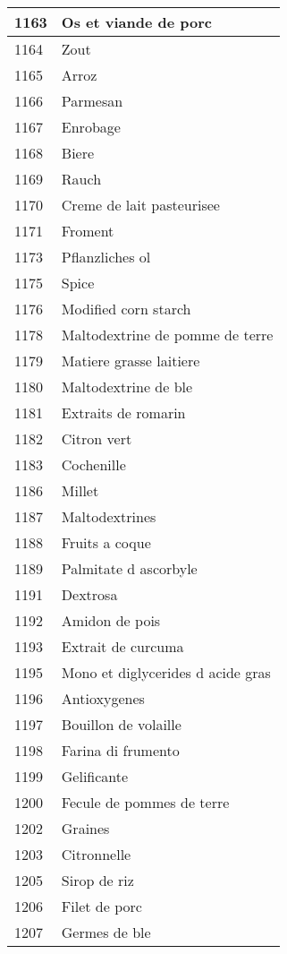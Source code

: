 \begin{longtable}{|l|l|}
1163 & Os et viande de porc \\ \hline 
1164 & Zout \\ \hline 
1165 & Arroz \\ \hline 
1166 & Parmesan \\ \hline 
1167 & Enrobage \\ \hline 
1168 & Biere \\ \hline 
1169 & Rauch \\ \hline 
1170 & Creme de lait pasteurisee \\ \hline 
1171 & Froment \\ \hline 
1173 & Pflanzliches ol \\ \hline 
1175 & Spice \\ \hline 
1176 & Modified corn starch \\ \hline 
1178 & Maltodextrine de pomme de terre \\ \hline 
1179 & Matiere grasse laitiere \\ \hline 
1180 & Maltodextrine de ble \\ \hline 
1181 & Extraits de romarin \\ \hline 
1182 & Citron vert \\ \hline 
1183 & Cochenille \\ \hline 
1186 & Millet \\ \hline 
1187 & Maltodextrines \\ \hline 
1188 & Fruits a coque \\ \hline 
1189 & Palmitate d ascorbyle \\ \hline 
1191 & Dextrosa \\ \hline 
1192 & Amidon de pois \\ \hline 
1193 & Extrait de curcuma \\ \hline 
1195 & Mono et diglycerides d acide gras \\ \hline 
1196 & Antioxygenes \\ \hline 
1197 & Bouillon de volaille \\ \hline 
1198 & Farina di frumento \\ \hline 
1199 & Gelificante \\ \hline 
1200 & Fecule de pommes de terre \\ \hline 
1202 & Graines \\ \hline 
1203 & Citronnelle \\ \hline 
1205 & Sirop de riz \\ \hline 
1206 & Filet de porc \\ \hline 
1207 & Germes de ble \\ \hline 

\end{longtable}
